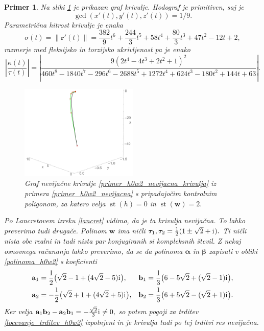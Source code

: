 \documentclass[12pt,a4paper,twoside]{article}
\newcommand{\iu}{\mathrm{i}\mkern1mu} %
\theoremstyle{definition} %
\theoremstyle{plain} %
\theoremstyle{primerstyle}
\newtheorem{primer}[definicija]{Primer}
\numberwithin{equation}{section}  %
\newcommand{\aV}{\mathbf{a}}
\newcommand{\bV}{\mathbf{b}}
\newcommand{\rV}{\mathbf{r}}
\newcommand{\wV}{\mathbf{w}}
\newcommand{\balpha}{\boldsymbol \alpha}
\newcommand{\bbeta}{\boldsymbol \beta}
\newcommand{\btau}{\boldsymbol \tau}
\DeclareMathOperator{\st}{st}
\begin{document}
\begin{primer}
	Na sliki \ref{fig:h0w2_nevijacna} je prikazan graf krivulje. Hodograf je primitiven, saj je $$\gcd(x'(t),y'(t),z'(t))=1/9.$$ Parametrična hitrost krivulje je enaka
	\begin{equation*}
		\sigma(t)=\lVert\rV'(t)\rVert=\frac{382}{9}t^6+\frac{244}{3}t^5+58t^4+\frac{80}{3}t^3+47t^2-12t+2,
	\end{equation*}
	razmerje med fleksijsko in torzijsko ukrivljenost pa je enako $$\left|\frac{\kappa(t)}{\tau(t)}\right|=\left|\frac{9(2t^4-4t^3+2t^2+1)^2}{460t^8-1840t^7-296t^6-2688t^5+1272t^4+624t^3-180t^2+144t+63}\right|.$$ 
	\begin{figure}[h]
	  \centering
	  \includegraphics[width=0.5\textwidth]{images/h0w2_nevijacna.pdf}
	  \caption[Primer nevijačne krivulje ($\st(h)=0,$ $\st(\wV)=2$)]{Graf nevijačne krivulje \eqref{primer_h0w2_nevijacna_krivulja} iz primera \ref{primer_h0w2_nevijacna} s pripadajočim kontrolnim poligonom, za katero velja $\st(h)=0$ in $\st(\wV)=2.$}
	  \label{fig:h0w2_nevijacna}
	\end{figure}
	Po Lancretovem izreku \ref{lancret} vidimo, da je ta krivulja nevijačna. To lahko preverimo tudi drugače. Polinom $\wV$ ima ničli $\btau_1,\btau_2=\frac{1}{2}(1\pm\sqrt{2}+\iu).$ Ti ničli nista obe realni in tudi nista par konjugiranih si kompleksnih števil. Z nekaj osnovnega računanja lahko preverimo, da se da polinoma $\balpha$ in $\bbeta$ zapisati v obliki \eqref{polinoma_h0w2} s koeficienti
	\begin{align*}
		\aV_1&=\frac{1}{2}\big(\sqrt{2}-1+(4\sqrt{2}-5)\iu\big),&\bV_1&=\frac{1}{3}\big(6-5\sqrt{2}+(\sqrt{2}-1)\iu\big),\\
		\aV_2&=-\frac{1}{2}\big(\sqrt{2}+1+(4\sqrt{2}+5)\iu\big),&\bV_2&=\frac{1}{3}\big(6+5\sqrt{2}-(\sqrt{2}+1)\iu\big).
	\end{align*}
	Ker velja $\aV_1\bV_2-\aV_2\bV_1=-\frac{\sqrt{2}}{3}\iu\neq 0,$ so potem pogoji za trditev \ref{locevanje_trditev_h0w2} izpolnjeni in je krivulja tudi po tej trditvi res nevijačna.
\end{primer}
\end{document}
